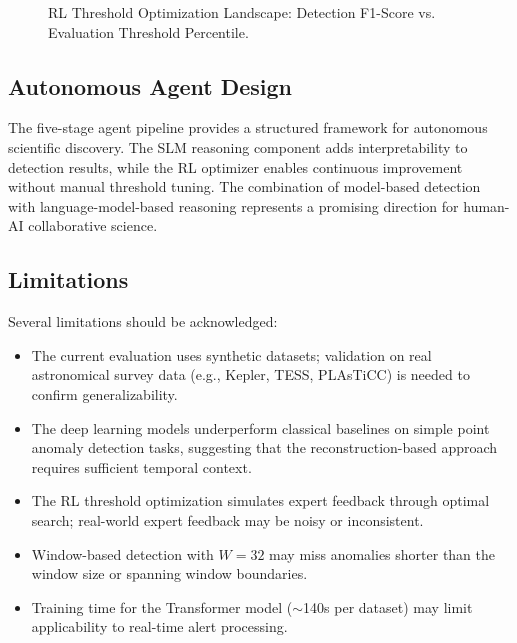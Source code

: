 \documentclass[conference]{IEEEtran}
\begin{document}
\begin{figure}[htbp]
{}
\caption{RL Threshold Optimization Landscape: Detection F1-Score vs. Evaluation Threshold Percentile.}
\label{fig:rl_landscape}
\end{figure}

\subsection{Autonomous Agent Design}

The five-stage agent pipeline provides a structured framework for autonomous scientific discovery. The SLM reasoning component adds interpretability to detection results, while the RL optimizer enables continuous improvement without manual threshold tuning. The combination of model-based detection with language-model-based reasoning represents a promising direction for human-AI collaborative science.

\subsection{Limitations}

Several limitations should be acknowledged:
\begin{itemize}
    \item The current evaluation uses synthetic datasets; validation on real astronomical survey data (e.g., Kepler, TESS, PLAsTiCC) is needed to confirm generalizability.
    \item The deep learning models underperform classical baselines on simple point anomaly detection tasks, suggesting that the reconstruction-based approach requires sufficient temporal context.
    \item The RL threshold optimization simulates expert feedback through optimal search; real-world expert feedback may be noisy or inconsistent.
    \item Window-based detection with $W=32$ may miss anomalies shorter than the window size or spanning window boundaries.
    \item Training time for the Transformer model ($\sim$140s per dataset) may limit applicability to real-time alert processing.
\end{itemize}
\end{document}
